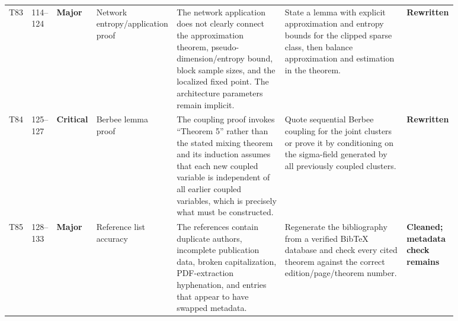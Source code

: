 \documentclass[11pt]{article}
\newcommand{\status}[1]{\textcolor{implgreen}{\textbf{#1}}}
\begin{document}
\begin{landscape}
\begin{longtable}{L{0.04\linewidth}L{0.055\linewidth}L{0.065\linewidth}L{0.11\linewidth}L{0.245\linewidth}L{0.275\linewidth}L{0.095\linewidth}}
T83 & 114--124 & \textcolor{major}{\textbf{Major}} & Network entropy/application proof & The network application does not clearly connect the approximation theorem, pseudo-dimension/entropy bound, block sample sizes, and the localized fixed point. The architecture parameters remain implicit. & State a lemma with explicit approximation and entropy bounds for the clipped sparse class, then balance approximation and estimation in the theorem. & \status{Rewritten}\\
T84 & 125--127 & \textcolor{crit}{\textbf{Critical}} & Berbee lemma proof & The coupling proof invokes “Theorem 5” rather than the stated mixing theorem and its induction assumes that each new coupled variable is independent of all earlier coupled variables, which is precisely what must be constructed. & Quote sequential Berbee coupling for the joint clusters or prove it by conditioning on the sigma-field generated by all previously coupled clusters. & \status{Rewritten}\\
T85 & 128--133 & \textcolor{major}{\textbf{Major}} & Reference list accuracy & The references contain duplicate authors, incomplete publication data, broken capitalization, PDF-extraction hyphenation, and entries that appear to have swapped metadata. & Regenerate the bibliography from a verified BibTeX database and check every cited theorem against the correct edition/page/theorem number. & \status{Cleaned; metadata check remains}\\
\end{longtable}
\end{landscape}
\clearpage
\end{document}
